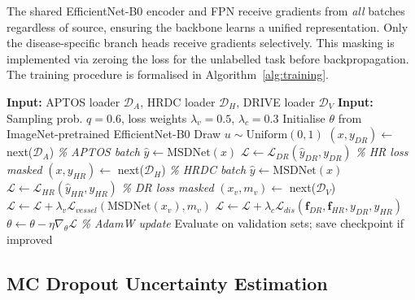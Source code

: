 \documentclass[conference]{IEEEtran}
\begin{document}
The shared EfficientNet-B0 encoder and FPN receive gradients from \textit{all} batches regardless of source, ensuring the backbone learns a unified representation. Only the disease-specific branch heads receive gradients selectively. This masking is implemented via zeroing the loss for the unlabelled task before backpropagation. The training procedure is formalised in Algorithm~\ref{alg:training}.

\begin{algorithm}[htbp]
\caption{MSDNet Multi-Dataset Alternating Training}
\label{alg:training}
\begin{algorithmic}[1]
\small
\STATE \textbf{Input:} APTOS loader $\mathcal{D}_A$, HRDC loader $\mathcal{D}_H$, DRIVE loader $\mathcal{D}_V$
\STATE \textbf{Input:} Sampling prob. $q{=}0.6$, loss weights $\lambda_v{=}0.5$, $\lambda_c{=}0.3$
\STATE Initialise $\theta$ from ImageNet-pretrained EfficientNet-B0
    \STATE Draw $u \sim \text{Uniform}(0,1)$
      \STATE $(x, y_{DR}) \leftarrow$ next($\mathcal{D}_A$) \quad \textit{\% APTOS batch}
      \STATE $\hat{y} \leftarrow \text{MSDNet}(x)$
      \STATE $\mathcal{L} \leftarrow \mathcal{L}_{DR}(\hat{y}_{DR}, y_{DR})$ \quad \textit{\% HR loss masked}
    \ELSE
      \STATE $(x, y_{HR}) \leftarrow$ next($\mathcal{D}_H$) \quad \textit{\% HRDC batch}
      \STATE $\hat{y} \leftarrow \text{MSDNet}(x)$
      \STATE $\mathcal{L} \leftarrow \mathcal{L}_{HR}(\hat{y}_{HR}, y_{HR})$ \quad \textit{\% DR loss masked}
    \ENDIF
      \STATE $(x_v, m_v) \leftarrow$ next($\mathcal{D}_V$)
      \STATE $\mathcal{L} \leftarrow \mathcal{L} + \lambda_v \mathcal{L}_{vessel}(\text{MSDNet}(x_v), m_v)$
    \ENDIF
      \STATE $\mathcal{L} \leftarrow \mathcal{L} + \lambda_c \mathcal{L}_{dis}(\mathbf{f}_{DR}, \mathbf{f}_{HR}, y_{DR}, y_{HR})$
    \ENDIF
    \STATE $\theta \leftarrow \theta - \eta \nabla_\theta \mathcal{L}$ \quad \textit{\% AdamW update}
  \ENDFOR
  \STATE Evaluate on validation sets; save checkpoint if improved
\ENDFOR
\end{algorithmic}
\end{algorithm}

\subsection{MC Dropout Uncertainty Estimation}
\end{document}
